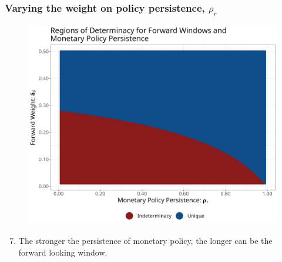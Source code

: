 \documentclass{beamer}
\begin{document}
\begin{frame}
	\frametitle{Varying the weight on policy persistence, $\rho_r$}	
	\begin{center}		
		\begin{figure}%
			\includegraphics[width=\textwidth,height=0.6\textheight,keepaspectratio]{../code/rho_deltaF.png}
		\end{figure}%
	\end{center}%
	\begin{enumerate}
		\setcounter{enumi}{6}
		\setlength{\itemsep}{1em}
		\item The stronger the persistence of monetary policy, the longer can be the forward looking window.  
	\end{enumerate}
\end{frame}
\end{document}
